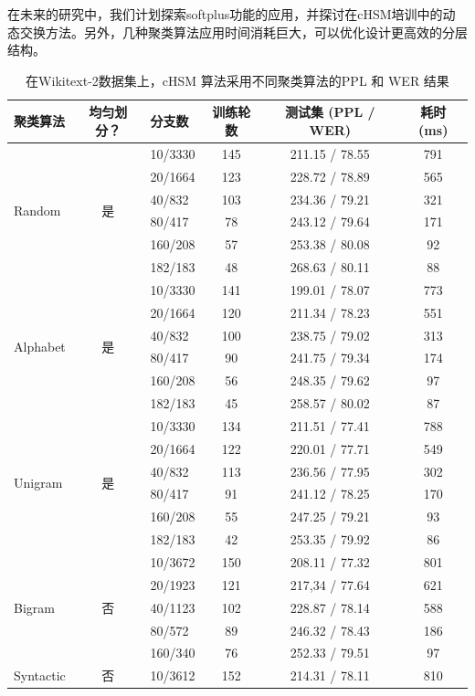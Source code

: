 在未来的研究中，我们计划探索softplus功能的应用，并探讨在cHSM培训中的动态交换方法。另外，几种聚类算法应用时间消耗巨大，可以优化设计更高效的分层结构。\begin{table}[!t]
  \centering
  \caption{在Wikitext-2数据集上，cHSM 算法采用不同聚类算法的PPL 和 WER 结果\label{table:clustering}}
  \begin{tabular}{lclccc} \toprule
聚类算法 & 均匀划分？&分支数& 训练轮数& 测试集 (PPL / WER)&耗时 (ms)\\ \midrule
  \multirow{6}{*}{Random}  &\multirow{6}{*}{是}&10/3330&145&211.15 / 78.55 &791\\
    &&20/1664&123&228.72 / 78.89&565\\
    &&40/832&103&234.36 / 79.21&321\\
    &&80/417&78&243.12 / 79.64&171\\
    &&160/208 &57&253.38 / 80.08&92\\
    &&182/183&48&268.63 / 80.11&88\\
  \midrule
  \multirow{6}{*}{Alphabet}  &\multirow{6}{*}{是}&10/3330 &141&199.01 / 78.07 &773\\
    &&20/1664 &120&211.34 / 78.23&551\\
    &&40/832 &100&238.75 / 79.02&313\\
    &&80/417 &90&241.75 / 79.34&174\\
    &&160/208 &56&248.35 / 79.62&97\\
    &&182/183&45&258.57 / 80.02&87\\
  \midrule
  \multirow{6}{*}{Unigram}   &\multirow{6}{*}{是} &10/3330&134&211.51 / 77.41 &788\\
    & &20/1664&122&220.01 / 77.71&549\\
    & &40/832&113&236.56 / 77.95&302\\
    & &80/417&91& 241.12 / 78.25&170\\
    & &160/208&55&247.25 / 79.21&93\\
    & &182/183&42&253.35 / 79.92&86\\
  \midrule
  \multirow{5}{*}{Bigram}   &\multirow{5}{*}{否}&10/3672&150&208.11 / 77.32&801\\
     &&20/1923&121&217,34 / 77.64&621\\
     &&40/1123&102&228.87 / 78.14&588\\
     &&80/572&89&246.32 / 78.43&186\\
     &&160/340&76&252.33 / 79.51&97\\
  \midrule
  \multirow{5}{*}{Syntactic}  &\multirow{5}{*}{否}&10/3612 &152&214.31 / 78.11&810\\

\end{tabular}
\end{table}
